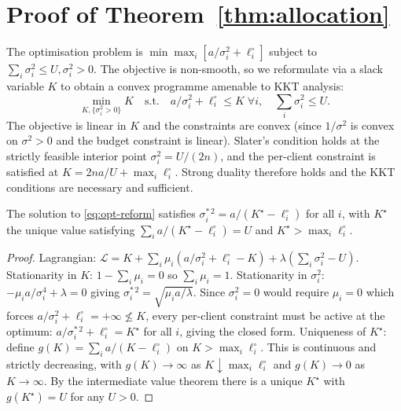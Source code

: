 \section{Proof of Theorem~\ref{thm:allocation}}
\label{app:thm2}

The optimisation problem is
\(\min \max_i [a/\sigma_i^2 + \ell_i^\circ]\) subject to
$\sum_i \sigma_i^2 \leq U, \sigma_i^2 > 0$. The objective is
non-smooth, so we reformulate via a slack variable $K$ to obtain a
convex programme amenable to KKT analysis:
\begin{equation}
\min_{K, \{\sigma_i^2 > 0\}} K
\quad\text{s.t.}\quad
a/\sigma_i^2 + \ell_i^\circ \leq K \;\forall i,
\quad \sum_i \sigma_i^2 \leq U.
\label{eq:opt-reform}
\end{equation}
The objective is linear in $K$ and the constraints are convex (since
$1/\sigma^2$ is convex on $\sigma^2>0$ and the budget constraint is
linear). Slater's condition holds at the strictly feasible interior
point $\sigma_i^2 = U/(2n)$, and the per-client constraint is satisfied
at $K = 2na/U + \max_i \ell_i^\circ$. Strong duality therefore holds
and the KKT conditions are necessary and sufficient.

\begin{lemma}
\label{lem:kkt}
The solution to \eqref{eq:opt-reform} satisfies
\(\sigma_i^{*\,2} = a / (K^\star - \ell_i^\circ)\) for all $i$, with
\(K^\star\) the unique value satisfying
\(\sum_i a/(K^\star - \ell_i^\circ) = U\) and \(K^\star > \max_i \ell_i^\circ\).
\end{lemma}
\begin{proof}
Lagrangian:
\(\mathcal{L} = K + \sum_i \mu_i(a/\sigma_i^2 + \ell_i^\circ - K)
                + \lambda(\sum_i \sigma_i^2 - U)\).
Stationarity in $K$: $1 - \sum_i \mu_i = 0$ so $\sum_i \mu_i = 1$.
Stationarity in $\sigma_i^2$:
$-\mu_i a /\sigma_i^4 + \lambda = 0$ giving
$\sigma_i^{*\,2} = \sqrt{\mu_i a / \lambda}$. Since $\sigma_i^2 = 0$ would
require $\mu_i = 0$ which forces $a/\sigma_i^2 + \ell_i^\circ = +\infty
\not\leq K$, every per-client constraint must be active at the optimum:
$a/\sigma_i^{*\,2} + \ell_i^\circ = K^\star$ for all $i$, giving the
closed form. Uniqueness of $K^\star$: define
\(g(K) = \sum_i a/(K - \ell_i^\circ)\) on $K > \max_i \ell_i^\circ$.
This is continuous and strictly decreasing, with
\(g(K) \to \infty\) as $K \downarrow \max_i \ell_i^\circ$ and
\(g(K) \to 0\) as $K \to \infty$. By the intermediate value theorem
there is a unique $K^\star$ with $g(K^\star) = U$ for any $U > 0$.
\end{proof}

